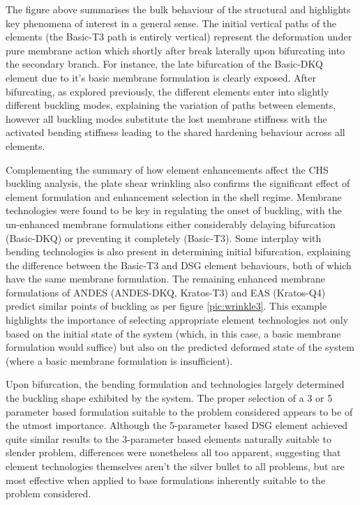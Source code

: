 The figure above summarises the bulk behaviour of the structural and highlights key phenomena of interest in a general sense. The initial vertical paths of the elements (the Basic-T3 path is entirely vertical) represent the deformation under pure membrane action which shortly after break laterally upon bifurcating into the secondary branch. For instance, the late bifurcation of the Basic-DKQ element due to it's basic membrane formulation is clearly exposed. After bifurcating, as explored previously, the different elements enter into slightly different buckling modes, explaining the variation of paths between elements, however all buckling modes substitute the lost membrane stiffness with the activated bending stiffness leading to the shared hardening behaviour across all elements.

Complementing the summary of how element enhancements affect the CHS buckling analysis, the plate shear wrinkling also confirms the significant effect of element formulation and enhancement selection in the shell regime. Membrane technologies were found to be key in regulating the onset of buckling, with the un-enhanced membrane formulations either considerably delaying bifurcation (Basic-DKQ) or preventing it completely (Basic-T3). Some interplay with bending technologies is also present in determining initial bifurcation, explaining the difference between the Basic-T3 and DSG element behaviours, both of which have the same membrane formulation. The remaining enhanced membrane formulations of ANDES (ANDES-DKQ, Kratos-T3) and EAS (Kratos-Q4) predict similar points of buckling as per figure \ref{pic:wrinkle3}. This example highlights the importance of selecting appropriate element technologies not only based on the initial state of the system (which, in this case, a basic membrane formulation would suffice) but also on the predicted deformed state of the system (where a basic membrane formulation is insufficient).

 Upon bifurcation, the bending formulation and technologies largely determined the buckling shape exhibited by the system. The proper selection of a 3 or 5 parameter based formulation suitable to the problem considered appears to be of the utmost importance. Although the 5-parameter based DSG element achieved quite similar results to the 3-parameter based elements naturally suitable to slender problem, differences were nonetheless all too apparent, suggesting that element technologies themselves aren't the silver bullet to all problems, but are most effective when applied to base formulations inherently suitable to the problem considered.
 
